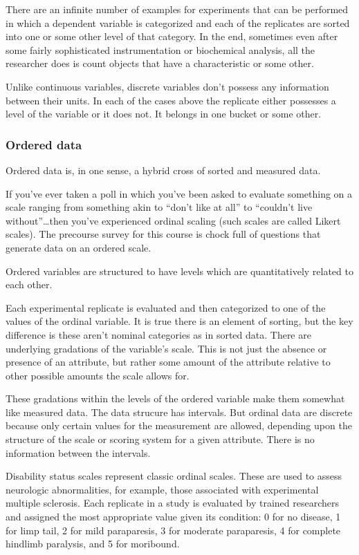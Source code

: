 \documentclass[]{book}
\begin{document}
There are an infinite number of examples for experiments that can be performed in which a dependent variable is categorized and each of the replicates are sorted into one or some other level of that category. In the end, sometimes even after some fairly sophisticated instrumentation or biochemical analysis, all the researcher does is count objects that have a characteristic or some other.

Unlike continuous variables, discrete variables don't possess any information between their units. In each of the cases above the replicate either possesses a level of the variable or it does not. It belongs in one bucket or some other.

\hypertarget{ordered-data}{%
\subsubsection{Ordered data}\label{ordered-data}}

Ordered data is, in one sense, a hybrid cross of sorted and measured data.

If you've ever taken a poll in which you've been asked to evaluate something on a scale ranging from something akin to ``don't like at all'' to ``couldn't live without''\ldots{}then you've experienced ordinal scaling (such scales are called Likert scales). The precourse survey for this course is chock full of questions that generate data on an ordered scale.

Ordered variables are structured to have levels which are quantitatively related to each other.

Each experimental replicate is evaluated and then categorized to one of the values of the ordinal variable. It is true there is an element of sorting, but the key difference is these aren't nominal categories as in sorted data. There are underlying gradations of the variable's scale. This is not just the absence or presence of an attribute, but rather some amount of the attribute relative to other possible amounts the scale allows for.

These gradations within the levels of the ordered variable make them somewhat like measured data. The data strucure has intervals. But ordinal data are discrete because only certain values for the measurement are allowed, depending upon the structure of the scale or scoring system for a given attribute. There is no information between the intervals.

Disability status scales represent classic ordinal scales. These are used to assess neurologic abnormalities, for example, those associated with experimental multiple sclerosis. Each replicate in a study is evaluated by trained researchers and assigned the most appropriate value given its condition: 0 for no disease, 1 for limp tail, 2 for mild paraparesis, 3 for moderate paraparesis, 4 for complete hindlimb paralysis, and 5 for moribound.
\end{document}
